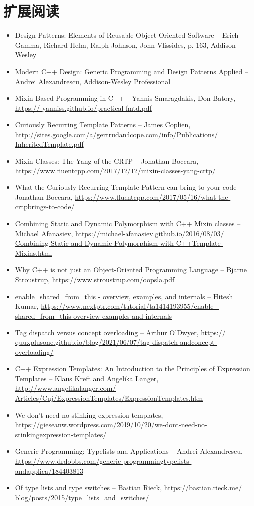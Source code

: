 \section{扩展阅读}
\begin{itemize}
  \item Design Patterns: Elements of Reusable Object-Oriented Software – Erich Gamma, Richard Helm, Ralph Johnson, John Vlissides, p. 163, Addison-Wesley
  \item Modern C++ Design: Generic Programming and Design Patterns Applied – Andrei Alexandrescu, Addison-Wesley Professional
  \item Mixin-Based Programming in C++ – Yannis Smaragdakis, Don Batory, \url{https:// yanniss.github.io/practical-fmtd.pdf}
  \item Curiously Recurring Template Patterns – James Coplien, \url{http://sites.google.com/a/gertrudandcope.com/info/Publications/ InheritedTemplate.pdf}
  \item Mixin Classes: The Yang of the CRTP – Jonathan Boccara, \url{https://www.fluentcpp.com/2017/12/12/mixin-classes-yang-crtp/}
  \item What the Curiously Recurring Template Pattern can bring to your code – Jonathan Boccara, \url{https://www.fluentcpp.com/2017/05/16/what-the-crtpbrings-to-code/}
  \item Combining Static and Dynamic Polymorphism with C++ Mixin classes – Michael Afanasiev, \url{https://michael-afanasiev.github.io/2016/08/03/ Combining-Static-and-Dynamic-Polymorphism-with-C++Template-Mixins.html}
  \item Why C++ is not just an Object-Oriented Programming Language – Bjarne Stroustrup, https://www.stroustrup.com/oopsla.pdf
  \item enable\_shared\_from\_this - overview, examples, and internals – Hitesh Kumar, \url{https://www.nextptr.com/tutorial/ta1414193955/enable_ shared_from_this-overview-examples-and-internals}
  \item Tag dispatch versus concept overloading – Arthur O’Dwyer, \url{https:// quuxplusone.github.io/blog/2021/06/07/tag-dispatch-andconcept-overloading/}
  \item C++ Expression Templates: An Introduction to the Principles of Expression Templates – Klaus Kreft and Angelika Langer, \url{http://www.angelikalanger.com/ Articles/Cuj/ExpressionTemplates/ExpressionTemplates.htm}
  \item We don’t need no stinking expression templates, \url{https://gieseanw.wordpress.com/2019/10/20/we-dont-need-no-stinkingexpression-templates/}
  \item Generic Programming: Typelists and Applications – Andrei Alexandrescu, \url{https://www.drdobbs.com/generic-programmingtypelists-andapplica/184403813}
  \item Of type lists and type switches – Bastian Rieck,\url{ https://bastian.rieck.me/ blog/posts/2015/type_lists_and_switches/}
\end{itemize}